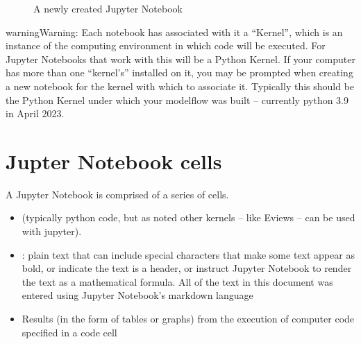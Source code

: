 \documentclass[letterpaper,10pt,english]{jupyterBook}
\let\sphinxpxdimen\pdfpxdimen\else\newdimen\sphinxpxdimen
\begin{document}
\sphinxAtStartPar
{}

\begin{figure}[htbp]
\centering
\capstart

\noindent\sphinxincludegraphics[height=150\sphinxpxdimen]{{Newcell}.png}
\caption{A newly created Jupyter Notebook}\label{\detokenize{content/04_PythonEssentials/Intro_Jupyter_notebook:id1}}\end{figure}

\begin{sphinxadmonition}{warning}{Warning:}
\sphinxAtStartPar
Each notebook has associated with it a “Kernel”, which is an instance of the computing environment in which code will be executed. For Jupyter Notebooks that work with  this will be a Python Kernel. If your computer has more than one “kernel’s” installed on it, you may be prompted when creating a new notebook for the kernel with which to associate it.  Typically this should be the Python Kernel under which your modelflow was built – currently python 3.9 in April 2023.
\end{sphinxadmonition}


\section{Jupter Notebook cells}
\label{\detokenize{content/04_PythonEssentials/Intro_Jupyter_notebook:jupter-notebook-cells}}
\sphinxAtStartPar
A Jupyter Notebook is comprised of a series of cells.

\sphinxAtStartPar
{}
\begin{itemize}
\item {} 
\sphinxAtStartPar
{} (typically python code, but as noted other kernels – like Eviews – can be used with jupyter).

\item {} 
\sphinxAtStartPar
{}: plain text that can include special characters that make some text appear as bold, or indicate the text is a header, or instruct Jupyter Notebook to render the text as a mathematical formula.  All of the text in this document was entered using Jupyter Notebook’s markdown language

\item {} 
\sphinxAtStartPar
Results (in the form of tables or graphs) from the execution of computer code specified in a code cell

\end{itemize}
\end{document}
